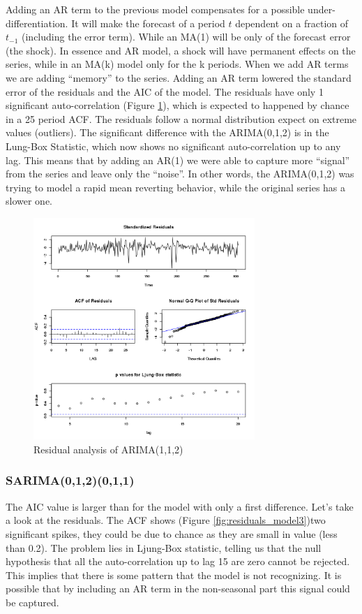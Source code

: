Adding an AR term to the previous model compensates for  a possible under-differentiation.  It will make the forecast of a period $t$ dependent on a fraction of $t_{-1}$ (including the error term).  While an MA(1) will be only of the forecast error (the shock). In essence and AR model, a shock will have permanent effects on the series, while in an MA(k) model only for the k periods. When we add AR terms we are adding “memory” to the series.  
Adding an AR term lowered the standard error of the residuals and the AIC of the model.  The residuals have only 1 significant auto-correlation (Figure \ref{fig:residuals_model2}), which is expected to happened by chance in a 25 period ACF. The residuals follow a normal distribution expect on extreme values (outliers). The significant difference with the ARIMA(0,1,2) is in the Lung-Box Statistic, which now shows no significant auto-correlation up to any lag. This means that by adding an AR(1) we were able to capture more “signal” from the series and leave only the “noise”. In other words, the ARIMA(0,1,2) was trying to model a rapid mean reverting behavior, while the original series has a slower one. 
\begin{figure}[!htb]
\begin{center}
\includegraphics[width=8.4cm]{residuals_model2.png}    %
\caption{Residual analysis of ARIMA(1,1,2)} 
\label{fig:residuals_model2}
\end{center}
\end{figure}


\subsubsection{SARIMA(0,1,2)(0,1,1)}The AIC value is larger than for the model with only a first difference. Let’s take a look at the residuals. The ACF shows (Figure \ref{fig:residuals_model3})two significant spikes, they could be due to chance as they are small in value (less than 0.2). The problem lies in Ljung-Box statistic, telling us that the null hypothesis that all the auto-correlation up to lag 15 are zero cannot be rejected. This implies that there is some pattern that the model is not recognizing. It is possible that by including an AR term in the non-seasonal part this signal could be captured. 

